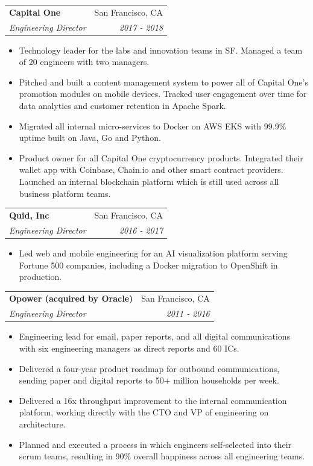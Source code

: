\documentclass[letterpaper,11pt]{article}
\makeatletter
\newcommand{\resumeSubheading}[4]{
  \vspace{-1pt}\item
    \begin{tabular*}{0.97\textwidth}[t]{l@{\extracolsep{\fill}}r}
      \textbf{#1} & #2 \\
      \textit{\small#3} & \textit{\small #4} \\
    \end{tabular*}\vspace{-5pt}
}
\newcommand{\resumeItemListStart}{\begin{itemize}}
\newcommand{\resumeItemListEnd}{\end{itemize}\vspace{-5pt}}
\makeatother
\begin{document}
    \pagebreak[3]

    \resumeSubheading
    {Capital One}{San Francisco, CA}
    {Engineering Director}{2017 - 2018}
    \resumeItemListStart
      \item Technology leader for the labs and innovation teams in SF. Managed a team of 20 engineers with two managers.
      \item Pitched and built a content management system to power all of Capital One’s promotion modules on mobile devices. Tracked user engagement over time for data analytics and customer retention in Apache Spark.
      \item Migrated all internal micro-services to Docker on AWS EKS with 99.9\% uptime built on Java, Go and Python.
      \item Product owner for all Capital One cryptocurrency products. Integrated their wallet app with Coinbase, Chain.io and other smart contract providers. Launched an internal blockchain platform which is still used across all business platform teams.
    \resumeItemListEnd

    \pagebreak[3]

    \resumeSubheading
    {Quid, Inc}{San Francisco, CA}
    {Engineering Director}{2016 - 2017}
    \resumeItemListStart
      \item Led web and mobile engineering for an AI visualization platform serving Fortune 500 companies, including a Docker migration to OpenShift in production.
    \resumeItemListEnd

    \pagebreak[3]

    \resumeSubheading
    {Opower (acquired by Oracle)}{San Francisco, CA}
    {Engineering Director}{2011 - 2016}
    \resumeItemListStart
      \item Engineering lead for email, paper reports, and all digital communications with six engineering managers as direct reports and 60 ICs.
      \item Delivered a four-year product roadmap for outbound communications, sending paper and digital reports to 50+ million households per week.
      \item Delivered a 16x throughput improvement to the internal communication platform, working directly with the CTO and VP of engineering on architecture.
      \item Planned and executed a process in which engineers self-selected into their scrum teams, resulting in 90\% overall happiness across all engineering teams.
    \resumeItemListEnd
\end{document}
